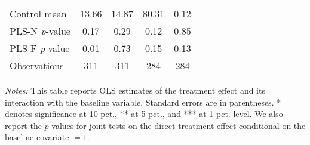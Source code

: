 \begin{table}[ht]
{\begin{threeparttable}
\begin{tabular}{l*{4}{c}}
Control mean    &    13.66         &    14.87         &    80.31         &     0.12         \\
PLS-N \emph{p}-value&     0.17         &     0.29         &     0.12         &     0.85         \\
PLS-F \emph{p}-value&     0.01         &     0.73         &     0.15         &     0.13         \\
Observations    &      311         &      311         &      284         &      284         \\
\bottomrule \end{tabular} \begin{tablenotes}[flushleft] \footnotesize \item \emph{Notes:} This table reports OLS estimates of the treatment effect and its interaction with the baseline variable. Standard errors are in parentheses. * denotes significance at 10 pct., ** at 5 pct., and *** at 1 pct. level. We also report the \(p\)-values for joint tests on the direct treatment effect conditional on the baseline covariate $= 1$. \end{tablenotes} \end{threeparttable} } \end{table}

